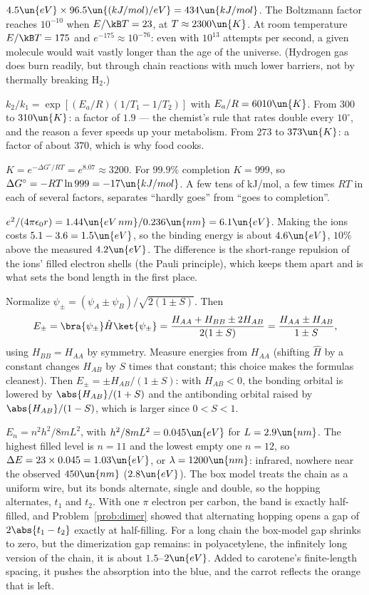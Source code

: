 
 $4.5\un{eV}\times96.5\un{(kJ/mol)/eV} = 434\un{kJ/mol}$. The Boltzmann factor reaches $10^{-10}$ when $E/\kB T = 23$, at $T\approx2300\un{K}$. At room temperature $E/\kB T = 175$ and $e^{-175}\approx10^{-76}$: even with $10^{13}$ attempts per second, a given molecule would wait vastly longer than the age of the universe. (Hydrogen gas does burn readily, but through chain reactions with much lower barriers, not by thermally breaking H$_2$.)

 $k_2/k_1 = \exp[(E_a/R)(1/T_1 - 1/T_2)]$ with $E_a/R = 6010\un{K}$. From $300$ to $310\un{K}$: a factor of $1.9$ --- the chemist's rule that rates double every $10^\circ$, and the reason a fever speeds up your metabolism. From $273$ to $373\un{K}$: a factor of about $370$, which is why food cooks.

 $K = e^{-\Delta G^\circ/RT} = e^{8.07}\approx3200$. For $99.9\%$ completion $K = 999$, so $\Delta G^\circ = -RT\ln999 = -17\un{kJ/mol}$. A few tens of kJ/mol, a few times $RT$ in each of several factors, separates ``hardly goes'' from ``goes to completion''.

 $e^2/(4\pi\epsilon_0r) = 1.44\un{eV\,nm}/0.236\un{nm} = 6.1\un{eV}$. Making the ions costs $5.1 - 3.6 = 1.5\un{eV}$, so the binding energy is about $4.6\un{eV}$, $10\%$ above the measured $4.2\un{eV}$. The difference is the short-range repulsion of the ions' filled electron shells (the Pauli principle), which keeps them apart and is what sets the bond length in the first place.

 Normalize $\psi_\pm = (\psi_A\pm\psi_B)/\sqrt{2(1\pm S)}$. Then
\[
  E_\pm = \bra{\psi_\pm}\hat H\ket{\psi_\pm} = \frac{H_{AA}+H_{BB}\pm2H_{AB}}{2(1\pm S)} = \frac{H_{AA}\pm H_{AB}}{1\pm S},
\]
using $H_{BB} = H_{AA}$ by symmetry. Measure energies from $H_{AA}$ (shifting $\hat H$ by a constant changes $H_{AB}$ by $S$ times that constant; this choice makes the formulas cleanest). Then $E_\pm = \pm H_{AB}/(1\pm S)$: with $H_{AB}<0$, the bonding orbital is lowered by $\abs{H_{AB}}/(1+S)$ and the antibonding orbital raised by $\abs{H_{AB}}/(1-S)$, which is larger since $0<S<1$.

 $E_n = n^2h^2/8mL^2$, with $h^2/8mL^2 = 0.045\un{eV}$ for $L = 2.9\un{nm}$. The highest filled level is $n = 11$ and the lowest empty one $n = 12$, so $\Delta E = 23\times0.045 = 1.03\un{eV}$, or $\lambda = 1200\un{nm}$: infrared, nowhere near the observed $450\un{nm}$ ($2.8\un{eV}$). The box model treats the chain as a uniform wire, but its bonds alternate, single and double, so the hopping alternates, $t_1$ and $t_2$. With one $\pi$ electron per carbon, the band is exactly half-filled, and Problem~\ref{prob:dimer} showed that alternating hopping opens a gap of $2\abs{t_1-t_2}$ exactly at half-filling. For a long chain the box-model gap shrinks to zero, but the dimerization gap remains: in polyacetylene, the infinitely long version of the chain, it is about $1.5$--$2\un{eV}$. Added to carotene's finite-length spacing, it pushes the absorption into the blue, and the carrot reflects the orange that is left.

